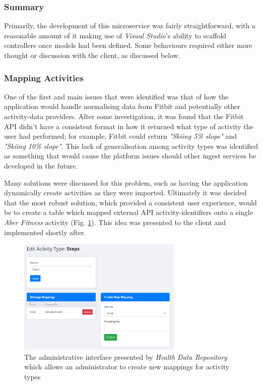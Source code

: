 \subsubsection{Summary}
Primarily, the development of this microservice was fairly straightforward,  with a reasonable amount of it making use of \textit{Visual Studio}'s ability to scaffold controllers once models had been defined. Some behaviours required either more thought or discussion with the client, as discussed below.

\subsubsection{Mapping Activities}

One of the first and main issues that were identified was that of how the application would handle normalising data from Fitbit and potentially other activity-data providers. After some investigation, it was found that the Fitbit API didn't have a consistent format in how it returned what type of activity the user had performed; for example, Fitbit could return \textit{"Skiing 5\% slope"} and \textit{"Skiing 10\% slope"}. This lack of generalisation among activity types was identified as something that would cause the platform issues should other ingest services be developed in the future. 

Many solutions were discussed for this problem, such as having the application dynamically create activities as they were imported. Ultimately it was decided that the most robust solution, which provided a consistent user experience, would be to create a table which mapped external API activity-identifiers onto a single \textit{Aber Fitness} activity (Fig. \ref{fig:health_mappings}). This idea was presented to the client and implemented shortly after.

\begin{figure}[H]
    \centering
    \includegraphics[width=0.7\textwidth]{Images/Chpt5_HealthData_Mapping.png}
    \caption{The administrative interface presented by \textit{Health Data Repository} which allows an administrator to create new mappings for activity types}
    \label{fig:health_mappings}
\end{figure}

